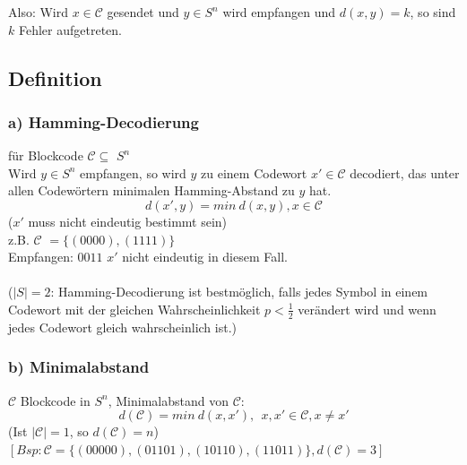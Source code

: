 \noindent Also: Wird $x \in \mathcal{C}$ gesendet und $y \in S^n$ wird empfangen und $d(x,y)=k$, so sind $k$ Fehler aufgetreten.
\subsection{Definition}
\subsubsection{a) Hamming-Decodierung}
f\"ur Blockcode $\mathcal{C} \subseteq$ $S^n$ \\
Wird $y \in S^n$ empfangen, so wird $y$ zu einem Codewort $x' \in \mathcal{C}$ decodiert, das unter allen Codew\"ortern minimalen Hamming-Abstand zu $y$ hat.
\[
	d(x',y)=min\  d(x,y), x \in \mathcal{C}
\]
($x'$ muss nicht eindeutig bestimmt sein)\\
z.B. $\mathcal{C}$ $ = \{ (0000), (1111) \}$\\
Empfangen: $0011$ $x'$ nicht eindeutig in diesem Fall.\\
\\
($\left| S \right | = 2$: Hamming-Decodierung ist bestm\"oglich, falls jedes Symbol in einem Codewort mit der gleichen Wahrscheinlichkeit $p < \frac{1}{2}$ ver\"andert wird und wenn jedes Codewort gleich wahrscheinlich ist.)

\subsubsection{b) Minimalabstand}
$\mathcal{C}$ Blockcode in $S^n$, Minimalabstand von $\mathcal{C}$:
\[
	d(\mathcal{C}) = min \  d(x,x')\mathbf{,}\ \  x,x' \in \mathcal{C}, x \neq x'
\]
(Ist $\left| \mathcal{C} \right| = 1$, so $d(\mathcal{C})=n$)\\
$[Bsp: \mathcal{C} = \lbrace (00000),(01101),(10110),(11011) \rbrace , d(\mathcal{C})=3]$

